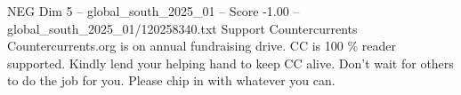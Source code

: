 \begin{textsample}{NEG Dim 5 – global\_south\_2025\_01 – Score -1.00 – global\_south\_2025\_01/120258340.txt}
Support Countercurrents Countercurrents.org is on annual fundraising drive.
CC is 100 \% reader supported.
Kindly lend your helping hand to keep CC alive.
Don't wait for others to do the job for you.
Please chip in with whatever you can.

\end{textsample}
